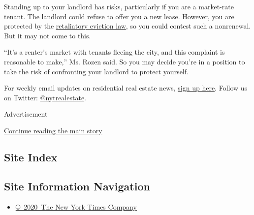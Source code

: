 Standing up to your landlord has risks, particularly if you are a
market-rate tenant. The landlord could refuse to offer you a new lease.
However, you are protected by the
\href{https://www1.nyc.gov/site/fairhousing/rights-responsibilities/retaliation.page}{retaliatory
eviction law}, so you could contest such a nonrenewal. But it may not
come to this.

``It's a renter's market with tenants fleeing the city, and this
complaint is reasonable to make,'' Ms. Rozen said. So you may decide
you're in a position to take the risk of confronting your landlord to
protect yourself.

For weekly email updates on residential real estate news,
\href{http://www.nytimes3xbfgragh.onion/newsletters/realestate/}{sign up
here}. Follow us on Twitter:
\href{https://twitter.com/nytrealestate}{@nytrealestate}.

Advertisement

\protect\hyperlink{after-bottom}{Continue reading the main story}

\hypertarget{site-index}{%
\subsection{Site Index}\label{site-index}}

\hypertarget{site-information-navigation}{%
\subsection{Site Information
Navigation}\label{site-information-navigation}}

\begin{itemize}
\tightlist
\item
  \href{https://help.nytimes3xbfgragh.onion/hc/en-us/articles/115014792127-Copyright-notice}{©~2020~The
  New York Times Company}
\end{itemize}


